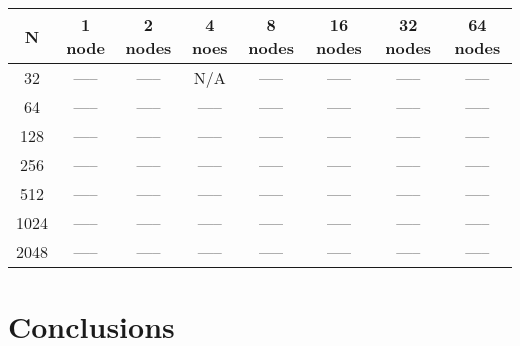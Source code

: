\documentclass[11pt]{article}
\begin{document}
\begin{table}[!htbp]
{\begin{tabular}{ |c|c|c|c|c|c|c|c|  }
\hline
N & 1 node & 2 nodes & 4 noes & 8 nodes & 16 nodes & 32 nodes & 64 nodes \\
\hline
32   & ----- & ----- & N/A   & ----- & ----- & ----- & ----- \\
64   & ----- & ----- & ----- & ----- & ----- & ----- & ----- \\
128  & ----- & ----- & ----- & ----- & ----- & ----- & ----- \\
256  & ----- & ----- & ----- & ----- & ----- & ----- & ----- \\
512  & ----- & ----- & ----- & ----- & ----- & ----- & ----- \\
1024 & ----- & ----- & ----- & ----- & ----- & ----- & ----- \\
2048 & ----- & ----- & ----- & ----- & ----- & ----- & ----- \\
\hline
\end{tabular}
}
\end{table}
\pagebreak
\section{Conclusions}
\end{document}
